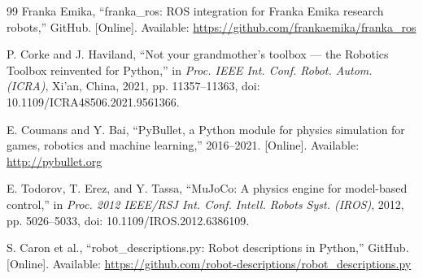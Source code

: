 \documentclass[10pt,conference]{IEEEtran}
\begin{document}
\begin{thebibliography}{99}
Franka Emika, ``franka\_ros: ROS integration for Franka Emika research robots,''
GitHub. [Online]. Available: \url{https://github.com/frankaemika/franka_ros}

P. Corke and J. Haviland, ``Not your grandmother's toolbox --- the Robotics
Toolbox reinvented for Python,'' in \emph{Proc. IEEE Int. Conf. Robot. Autom.
(ICRA)}, Xi'an, China, 2021, pp. 11357--11363,
doi: 10.1109/ICRA48506.2021.9561366.

E. Coumans and Y. Bai, ``PyBullet, a Python module for physics simulation for
games, robotics and machine learning,'' 2016--2021. [Online]. Available:
\url{http://pybullet.org}

E. Todorov, T. Erez, and Y. Tassa, ``MuJoCo: A physics engine for model-based
control,'' in \emph{Proc. 2012 IEEE/RSJ Int. Conf. Intell. Robots Syst. (IROS)},
2012, pp. 5026--5033, doi: 10.1109/IROS.2012.6386109.

S. Caron et al., ``robot\_descriptions.py: Robot descriptions in Python,''
GitHub. [Online]. Available:
\url{https://github.com/robot-descriptions/robot_descriptions.py}

\end{thebibliography}
\end{document}
